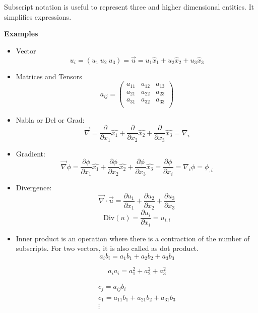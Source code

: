 Subscript notation is useful to represent three and higher dimensional entities. It simplifies expressions.

{\bf Examples}
\begin{itemize}

\item Vector
$$ u_i = \left( u_1 \  u_2 \  u_3 \right) = \vec{u} = u_1 \hat{x}_1 + u_2 \hat{x}_2 + u_3 \hat{x}_3  $$

\item Matrices and Tensors
\begin{equation*}
a_{ij} = \left( \begin{array}{ccc}
a_{11} & a_{12} & a_{13} \\
a_{21} & a_{22} & a_{23} \\
a_{31} & a_{32} & a_{33} \\
\end{array}\right) 
\end{equation*} 

\item Nabla or Del or Grad:
\begin{equation*}
\vec{\nabla} =
\frac{\partial}{\partial x_1} \hat{x_1} +
\frac{\partial}{\partial x_2} \hat{x_2} +
\frac{\partial}{\partial x_3} \hat{x_3}
= \nabla_i
\end{equation*} 

\item Gradient:
\begin{equation*}
\vec{\nabla}\phi =
\frac{\partial \phi}{\partial x_1} \hat{x_1} +
\frac{\partial \phi}{\partial x_2} \hat{x_2} +
\frac{\partial \phi}{\partial x_3} \hat{x_3}
= \frac{\partial \phi}{\partial x_i} 
= \nabla_i\phi 
= \phi_{,i}
\end{equation*} 

\item Divergence:
$$ \vec{\nabla}\cdot\vec{u} = \frac{\partial u_1}{\partial x_1} + \frac{\partial u_2}{\partial x_2} + \frac{\partial u_3}{\partial x_3} $$
$$\text{Div}(u) = \frac{\partial u_i}{\partial x_i} = u_{i,i} $$

\item Inner product  is an operation where there is a contraction of the number of subscripts. For two vectors, it is also called as dot product.
$$a_{i}b_{i} = a_1b_1 + a_2b_2 + a_3b_3 $$

$$ a_{i}a_{i} = a_1^2 + a_2^2 + a_3^2 $$

\begin{equation*}
\begin{array}{c}
c_j = a_{ij}b_{i} \\
c_1 = a_{11}b_1 + a_{21}b_2 + a_{31}b_3\\
\vdots
\end{array}
\end{equation*} 



\end{itemize}

